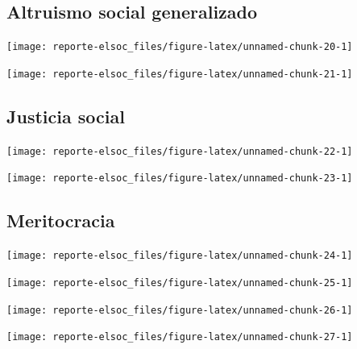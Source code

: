 \documentclass[
  12pt,
]{book}
\begin{document}
\hypertarget{altruismo-social-generalizado}{%
\subsection{Altruismo social generalizado}\label{altruismo-social-generalizado}}

\begin{center}\texttt{[image: reporte-elsoc\_files/figure-latex/unnamed-chunk-20-1]} \end{center}

\begin{center}\texttt{[image: reporte-elsoc\_files/figure-latex/unnamed-chunk-21-1]} \end{center}

\hypertarget{justicia-social}{%
\subsection{Justicia social}\label{justicia-social}}

\begin{center}\texttt{[image: reporte-elsoc\_files/figure-latex/unnamed-chunk-22-1]} \end{center}

\begin{center}\texttt{[image: reporte-elsoc\_files/figure-latex/unnamed-chunk-23-1]} \end{center}

\hypertarget{meritocracia}{%
\subsection{Meritocracia}\label{meritocracia}}

\begin{center}\texttt{[image: reporte-elsoc\_files/figure-latex/unnamed-chunk-24-1]} \end{center}

\begin{center}\texttt{[image: reporte-elsoc\_files/figure-latex/unnamed-chunk-25-1]} \end{center}

\begin{center}\texttt{[image: reporte-elsoc\_files/figure-latex/unnamed-chunk-26-1]} \end{center}

\begin{center}\texttt{[image: reporte-elsoc\_files/figure-latex/unnamed-chunk-27-1]} \end{center}
\end{document}
